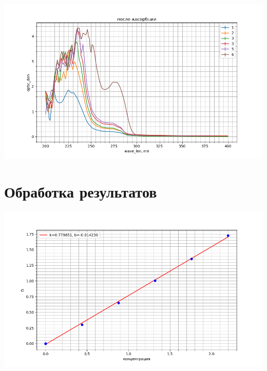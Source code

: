 \documentclass[a4paper]{article}
\begin{document}
\graphicspath{{./}}
		\begin{center}
		
			\includegraphics[scale=0.8]{gr_with.png}


	\par
 \vspace{0.3cm}
 \end{center}
\vspace{0.3cm}
\par



\section{\LARGE \textbf{Обработка результатов}}
\par

\graphicspath{{./}}
		\begin{center}
		
			\includegraphics[scale=0.8]{D_экст.png}
	
	\par
 \vspace{0.3cm}
 \end{center}
\end{document}
